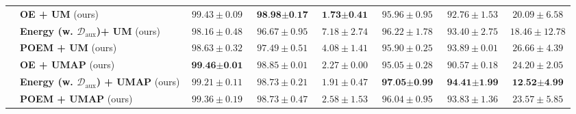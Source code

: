 \documentclass{article}
\theoremstyle{plain}
\theoremstyle{definition}
\theoremstyle{remark}
\begin{document}
\begin{table}[t!]
{\begin{tabular}{c|l|ccc|ccc}
         & \textbf{OE + UM} (ours) & $99.43\pm0.09$ & $\textbf{98.98}\pm\textbf{0.17}$ & $\textbf{1.73}\pm\textbf{0.41}$ & $95.96\pm0.95$ & $92.76\pm1.53$ & $20.09\pm6.58$\\
         & \textbf{Energy (w. $\mathcal{D}_\text{aux}$)+ UM} (ours) & $98.16\pm0.48$ & $96.67\pm0.95$ & $7.18\pm2.74$ & $96.22\pm1.78$ & $93.40\pm2.75$ & $18.46\pm12.78$\\
         & \textbf{POEM + UM} (ours) & $98.63\pm0.32$ & $97.49\pm0.51$ & $4.08\pm1.41$ & $95.90\pm0.25$ & $93.89\pm0.01$ & $26.66\pm4.39$\\
         & \textbf{OE + UMAP} (ours) & $\textbf{99.46}\pm\textbf{0.01}$ & $98.85\pm0.01$ & $2.27\pm0.00$ & $95.05\pm0.28$ & $90.57\pm0.18$ & $24.20\pm2.05$\\
         & \textbf{Energy (w. $\mathcal{D}_\text{aux}$) + UMAP} (ours) & $99.21\pm0.11$ & $98.73\pm0.21$ & $1.91\pm0.47$ & $\textbf{97.05}\pm\textbf{0.99}$ & $\textbf{94.41}\pm\textbf{1.99}$ & $\textbf{12.52}\pm\textbf{4.99}$\\
         & \textbf{POEM + UMAP} (ours) & $99.36\pm0.19$ & $98.73\pm0.47$ & $2.58\pm1.53$ & $96.04\pm0.95$ & $93.83\pm1.36$ & $23.57\pm5.85$\\
        \bottomrule[1.5pt]
    \end{tabular}}
    \label{tab:label_zoom_in_SVHN_densenet}
\end{table}
\end{document}

